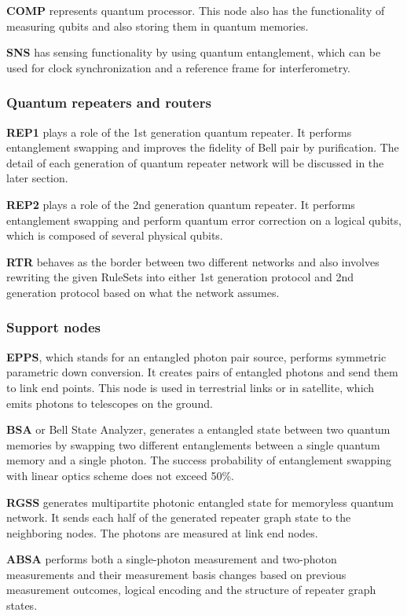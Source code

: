 \textbf{COMP} represents quantum processor.  This node also has the functionality of measuring qubits and also storing them in quantum memories.

\textbf{SNS} has sensing functionality by using quantum entanglement, which can be used for clock synchronization and a reference frame for interferometry. 

\subsubsection{Quantum repeaters and routers}

\textbf{REP1} plays a role of the 1st generation quantum repeater. It performs entanglement swapping and improves the fidelity of Bell pair by purification.
The detail of each generation of quantum repeater network will be discussed in the later section.

\textbf{REP2} plays a role of the 2nd generation quantum repeater. It performs entanglement swapping and perform quantum error correction on a logical qubits, which is composed of several physical qubits.

\textbf{RTR} behaves as the border between two different networks and also involves rewriting the given RuleSets into either 1st generation protocol and 2nd generation protocol based on what the network assumes.

\subsubsection{Support nodes}

\textbf{EPPS}, which stands for an entangled photon pair source, performs symmetric parametric down conversion.
It creates pairs of entangled photons and send them to link end points. This node is used in terrestrial links or in satellite, which emits photons to telescopes on the ground.

\textbf{BSA} or Bell State Analyzer, generates a entangled state between two quantum memories by swapping two different entanglements between a single quantum memory and a single photon.
The success probability of entanglement swapping with linear optics scheme does not exceed 50\%.

\textbf{RGSS} generates multipartite photonic entangled state for memoryless quantum network. It sends each half of the generated repeater graph state to the neighboring nodes.
The photons are measured at link end nodes.

\textbf{ABSA} performs both a single-photon measurement and two-photon measurements and their measurement basis changes based on previous measurement outcomes, logical encoding and the structure of repeater graph states.

